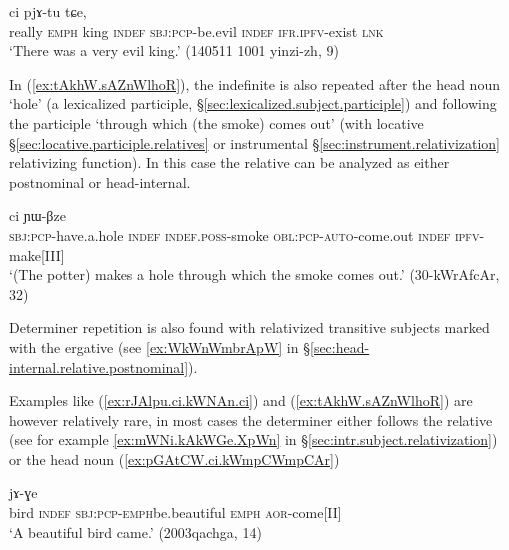 \begin{exe}
\ex \label{ex:rJAlpu.ci.kWNAn.ci}
 ci pjɤ-tu tɕe, \\
really \textsc{emph} king \textsc{indef} \textsc{sbj}:\textsc{pcp}-be.evil \textsc{indef} \textsc{ifr}.\textsc{ipfv}-exist \textsc{lnk} \\
\glt `There was a very evil king.' (140511 1001 yinzi-zh, 9)
 \end{exe} 

In (\ref{ex:tAkhW.sAZnWlhoR}), the indefinite  is also repeated after the head noun  `hole' (a lexicalized participle, §\ref{sec:lexicalized.subject.participle}) and following the participle  `through which (the smoke) comes out' (with locative §\ref{sec:locative.participle.relatives} or instrumental §\ref{sec:instrument.relativization} relativizing function). In this case the relative can be analyzed as either postnominal or head-internal.

\begin{exe}
\ex \label{ex:tAkhW.sAZnWlhoR}
 ci ɲɯ-βze \\
\textsc{sbj}:\textsc{pcp}-have.a.hole \textsc{indef} \textsc{indef}.\textsc{poss}-smoke \textsc{obl}:\textsc{pcp}-\textsc{auto}-come.out \textsc{indef} \textsc{ipfv}-make[III] \\ 
\glt `(The potter) makes a hole through which the smoke comes out.' (30-kWrAfcAr, 32)
\end{exe}

Determiner repetition is also found with relativized transitive subjects marked with the ergative (see \ref{ex:WkWnWmbrApW} in §\ref{sec:head-internal.relative.postnominal}).

Examples like (\ref{ex:rJAlpu.ci.kWNAn.ci}) and (\ref{ex:tAkhW.sAZnWlhoR}) are however relatively rare, in most cases the determiner either follows the relative (see for example  \ref{ex:mWNi.kAkWGe.XpWn} in §\ref{sec:intr.subject.relativization}) or the head noun (\ref{ex:pGAtCW.ci.kWmpCWmpCAr})
  
\begin{exe}
\ex \label{ex:pGAtCW.ci.kWmpCWmpCAr}
 jɤ-ɣe \\
bird \textsc{indef} \textsc{sbj}:\textsc{pcp}-\textsc{emph}\redp{}be.beautiful \textsc{emph} \textsc{aor}-come[II] \\
\glt `A beautiful bird came.' (2003qachga, 14)
\end{exe} 

